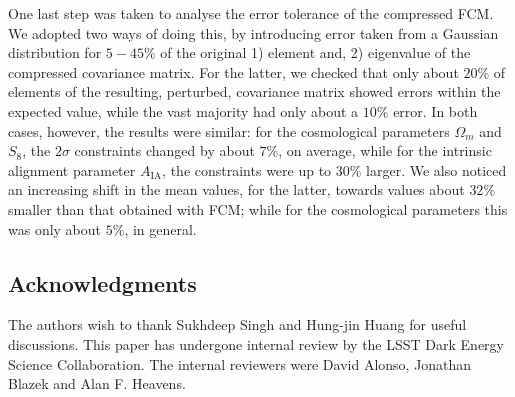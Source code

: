 \documentclass[twocolumn,nofootinbib]{\docclass}
\newcommand\full{FCM}
\begin{document}
	One last step was taken to analyse the error tolerance of the compressed \full. We adopted two ways of doing this, by introducing error taken from a Gaussian distribution for $5 - 45 \%$ of the original 1) element and, 2) eigenvalue of the compressed covariance matrix. For the latter, we checked that only about $20 \%$ of elements of the resulting, perturbed, covariance matrix showed errors within the expected value, while the vast majority had only about a $10\%$ error. In both cases, however, the results were similar: for the cosmological parameters $\Omega_m$ and $S_8$, the $2\sigma$ constraints changed by about $7\%$, on average, while for the intrinsic alignment parameter $A_{\mathrm{IA}}$, the constraints were up to $30\%$ larger. We also noticed an increasing shift in the mean values, for the latter, towards values about $32\%$ smaller than that obtained with \full; while for the cosmological parameters this was only about $5\%$, in general.
	
	
	\subsection*{Acknowledgments}
	
	The authors wish to thank Sukhdeep Singh and Hung-jin Huang for useful discussions.
	This paper has undergone internal review by the LSST Dark Energy Science Collaboration. The internal reviewers were David Alonso, Jonathan Blazek and Alan F. Heavens.
	
	
	
	
	
	
	
	
	
	
	
	
	
	
	
	
\end{document}
